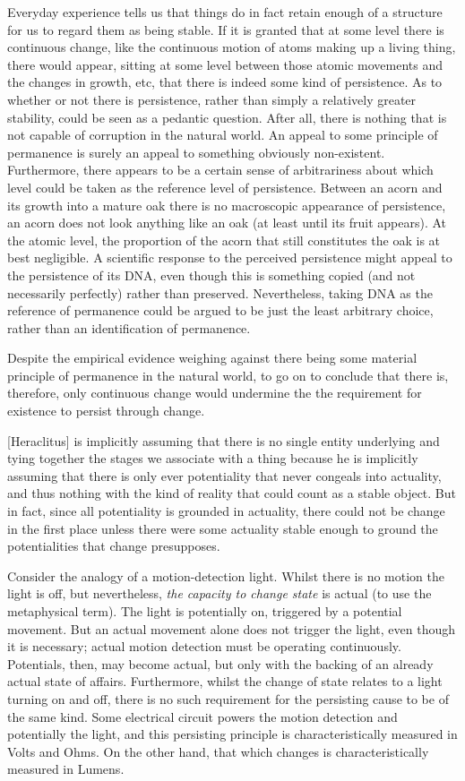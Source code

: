 Everyday experience tells us that things do in fact retain enough of a structure for us to regard them as being stable. If it is granted that at some level there is continuous change, like the continuous motion of atoms making up a living thing, there would appear, sitting at some level between those atomic movements and the changes in growth, etc, that there is indeed some kind of persistence. As to whether or not there is persistence, rather than simply a relatively greater stability, could be seen as a pedantic question. After all, there is nothing that is not capable of corruption in the natural world. An appeal to some principle of permanence is surely an appeal to something obviously non-existent. Furthermore, there appears to be a certain sense of arbitrariness about which level could be taken as the reference level of persistence. Between an acorn and its growth into a mature oak there is no macroscopic appearance of persistence, an acorn does not look anything like an oak (at least until its fruit appears). At the atomic level, the proportion of the acorn that still constitutes the oak is at best negligible. A scientific response to the perceived persistence might appeal to the persistence of its DNA, even though this is something copied (and not necessarily perfectly) rather than preserved. Nevertheless, taking DNA as the reference of permanence could be argued to be just the least arbitrary choice, rather than an identification of permanence.

Despite the empirical evidence weighing against there being some material principle of permanence in the natural world, to go on to conclude that there is, therefore, only continuous change would undermine the the requirement for existence to persist through change.
\begin{quoting}
{[Heraclitus]} is implicitly assuming that there is no single entity underlying and tying together the stages we associate with a thing because he is implicitly assuming that there is only ever potentiality that never congeals into actuality, and thus nothing with the kind of reality that could count as a stable object. But in fact, since all potentiality is grounded in actuality, there could not be change in the first place unless there were some actuality stable enough to ground the potentialities that change presupposes. \parencite[][19]{feser2019aristotle}
\end{quoting}
Consider the analogy of a motion-detection light. Whilst there is no motion the light is off, but nevertheless, \emph{the capacity to change state} is actual (to use the metaphysical term). The light is potentially on, triggered by a potential movement. But an actual movement alone does not trigger the light, even though it is necessary; actual motion detection must be operating continuously. Potentials, then, may become actual, but only with the backing of an already actual state of affairs. Furthermore, whilst the change of state relates to a light turning on and off, there is no such requirement for the persisting cause to be of the same kind. Some electrical circuit powers the motion detection and potentially the light, and this persisting principle is characteristically measured in Volts and Ohms. On the other hand, that which changes is characteristically measured in Lumens.

